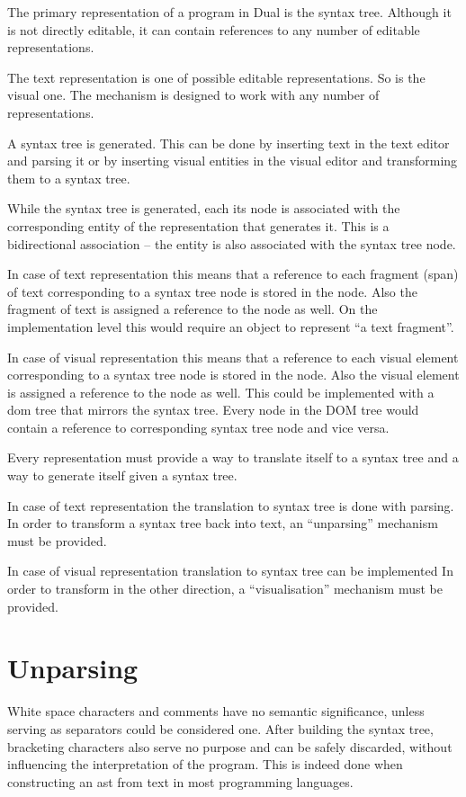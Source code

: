 The primary representation of a program in Dual is the syntax tree. Although it is not directly editable, it can contain references to any number of editable representations.

The text representation is one of possible editable representations. So is the visual one. The mechanism is designed to work with any number of representations.

A syntax tree is generated. This can be done by inserting text in the text editor and parsing it or by inserting visual entities in the visual editor and transforming them to a syntax tree.

While the syntax tree is generated, each its node is associated with the corresponding entity of the representation that generates it. This is a bidirectional association -- the entity is also associated with the syntax tree node. 

In case of text representation this means that a reference to each fragment (span) of text corresponding to a syntax tree node is stored in the node. Also the fragment of text is assigned a reference to the node as well. On the implementation level this would require an object to represent ``a text fragment''.

In case of visual representation this means that a reference to each visual element corresponding to a syntax tree node is stored in the node. Also the visual element is assigned a reference to the node as well. This could be implemented with a \acrshort{dom} tree that mirrors the syntax tree. Every node in the DOM tree would contain a reference to corresponding syntax tree node and vice versa.

Every representation must provide a way to translate itself to a syntax tree and a way to generate itself given a syntax tree.

In case of text representation the translation to syntax tree is done with parsing. In order to transform a syntax tree back into text, an ``unparsing'' mechanism must be provided.

In case of visual representation translation to syntax tree can be implemented 
In order to transform in the other direction, a ``visualisation'' mechanism must be provided.

\section{Unparsing}
White space characters and comments have no semantic significance, unless serving as separators could be considered one. After building the syntax tree,
bracketing characters also serve no purpose and can be safely discarded,
without influencing the interpretation of the program. This is indeed done when constructing an \acrshort{ast} from text in most programming languages.

